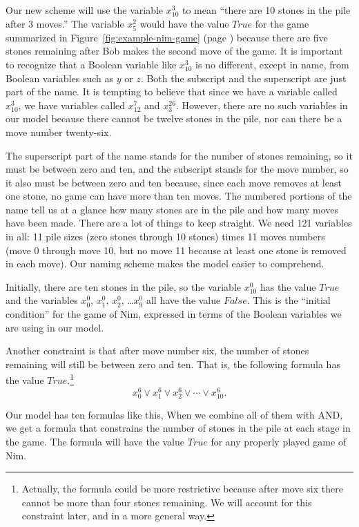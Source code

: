 {%

Our new scheme will use the variable $x_{10}^{3}$ to mean
``there are 10 stones in the pile after 3 moves.''
The variable $x_{5}^{2}$ would have the value $True$
for the game summarized in
Figure~\ref{fig:example-nim-game} (page \pageref{fig:example-nim-game})
because there are five stones remaining after Bob makes the
second move of the game.
It is important to recognize that a Boolean variable like $x_{10}^{3}$
is no different, except in name, from Boolean variables such as $y$ or $z$.
Both the subscript and the superscript are just part of the name.
It is tempting to believe that since we have a variable called $x_{10}^{3}$,
we have variables called $x_{12}^{7}$ and $x_{3}^{26}$.
However, there are no such variables in our model because there cannot be twelve stones
in the pile, nor can there be a move number twenty-six.

The superscript part of the name stands for the number of stones remaining,
so it must be between zero and ten, and the subscript stands for the
move number, so it also must be between zero and ten because,
since each move removes at least one stone, no game can have more than ten moves.
The numbered portions of the name tell us at
a glance how many stones are in the pile
and how many moves have been made.
There are a lot of things to keep straight.
We need 121 variables in all: 11 pile sizes (zero stones through 10 stones)
times 11 moves numbers (move 0 through move 10,
but no move 11 because at least one stone is removed in each move).
Our naming scheme makes the model easier to comprehend.

Initially, there are ten stones in the pile,
so the variable  $x_{10}^{0}$ has the value $True$
and the variables $x_{0}^{0}$, $x_{1}^{0}$, $x_{2}^{0}$, \dots $x_{9}^{0}$
all have the value $False$.
This is the ``initial condition'' for the game of Nim,
expressed in terms of the Boolean variables we are using
in our model.

Another constraint is that after move number six,
the number of stones remaining will still be between zero and ten.
That is, the following formula has the value $True$.\footnote{Actually,
the formula could be more restrictive because
after move six there cannot be more than four stones remaining.
We will account for this constraint later, and in a more general way.}
$$x_{0}^{6} \vee x_{1}^{6} \vee x_{2}^{6} \vee \cdots \vee x_{10}^{6}.$$

Our model has ten formulas like this,
When we combine all of them with AND,
we get a formula that constrains the number of stones
in the pile at each stage in the game.
The formula will have the value $True$ for any properly played game of Nim.

}
